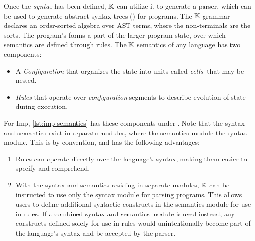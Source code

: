 Once the \emph{syntax} has been defined, $\mathbb{K}$ can utilize it to generate a
parser, which can be used to generate abstract
syntax trees (\ASTs{}) for programs. The $\mathbb{K}$ grammar declares an
order-sorted algebra over AST terms, where the non-terminals are
the sorts. The program's \AST{} forms a part of the larger
program state, over which semantics are defined through rules.
The $\mathbb{K}$ semantics of any language has two components:
\begin{itemize}
  \item A \emph{Configuration} that organizes the state
    into units called \emph{cells}, that may be nested.
  \item \emph{Rules} that operate over \emph{configuration}-segments
    to describe evolution of state during execution.
\end{itemize}
For Imp, \autoref{lst:imp-semantics} has these
components under .
Note that the syntax and semantics exist in separate modules,
where the semantics module 
the syntax module. This is by convention, and
has the following advantages:
\begin{enumerate}[label=\alph*)]
  \item Rules can operate directly over the language's syntax,
    making them easier to specify and comprehend.
  \item With the syntax and semantics residing in separate modules,
    $\mathbb{K}$ can be instructed to use only the syntax module for parsing programs.
    This allows users to define additional syntactic constructs in the semantics module
    for use in rules. If a combined syntax and semantics module is used instead,
    any constructs defined solely for use in rules
    would unintentionally become part of the language's syntax
    and be accepted by the parser.
\end{enumerate}

